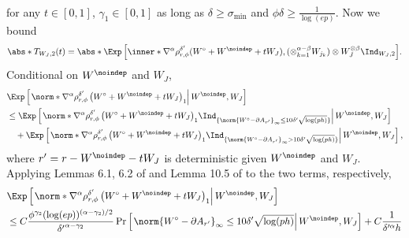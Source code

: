 \documentclass[aos]{imsart}
\begin{document}
\begin{appendix}
\begin{equation*}
\begin{aligned}
\end{aligned}
\end{equation*}
for any $t \in [0,1]$, $\gamma_1 \in [0,1]$ as long as $\delta \geq \sigma_{\min}$ and $\phi\delta \geq \frac{1}{\log(ep)}$.
Now we bound
\begin{equation*}
\begin{aligned}
    \abs*{T_{W_J,2}(t)}
    = \abs*{ \Exp\left[
        \inner*{\nabla^\alpha \rho_{r,\phi}^{\delta'} (W^\circ + W^\noindep + t W_J), 
        (\otimes_{k=1}^{\alpha-\beta} W_{j_k}) \otimes W_J^{\otimes \beta}} \Ind_{W_J, 2}
    \right] }. \\
\end{aligned}
\end{equation*}
Conditional on $W^\noindep$ and $W_J$,
\begin{equation*}
\begin{aligned}
    & \Exp\left[\left.
        \norm*{\nabla^\alpha \rho_{r,\phi}^{\delta'}
        \left(
            W^\circ + W^{\noindep} + t W_J
        \right)}_1
        \right| W^{\noindep}, W_J
    \right] \\
    & \leq \Exp\left[\left.
        \norm*{\nabla^\alpha \rho_{r,\phi}^{\delta'}
        \left(
            W^\circ + W^{\noindep} + t W_J
        \right)}_1
        \Ind_{\{ \norm{W^\circ - \partial A_{r'}}_\infty \leq 10 \delta' \sqrt{\log(ph)} \}}
        \right| W^{\noindep}, W_J
    \right] \\
    & \quad + \Exp\left[\left.
        \norm*{\nabla^\alpha \rho_{r,\phi}^{\delta'}
        \left(
            W^\circ + W^{\noindep} + t W_J
        \right)}_1
        \Ind_{\{ \norm{W^\circ - \partial A_{r'}}_\infty > 10 \delta' \sqrt{\log(ph)} \}}
        \right| W^{\noindep}, W_J
    \right],
\end{aligned}
\end{equation*}
where $r' = r - W^\noindep - t W_J$ is deterministic given $W^\noindep$ and $W_J$. Applying Lemmas 6.1, 6.2 of  and Lemma 10.5 of \citet{lopes2022central} to the two terms, respectively, 
\begin{equation*}
\begin{aligned}
    & \Exp\left[\left.
        \norm*{\nabla^\alpha \rho_{r,\phi}^{\delta'}
        \left(
            W^\circ + W^{\noindep} + t W_J
        \right)}_1
        \right| W^{\noindep}, W_J
    \right] \\
    & \leq C \frac{\phi^{\gamma_2} (\log(ep))^{(\alpha-\gamma_2)/2}}{{\delta'}^{\alpha-\gamma_2}}
    \Pr\left[\left. \norm{W^\circ - \partial A_{r'}}_\infty \leq 10 \delta' \sqrt{\log(ph)} \right| W^\noindep, W_J \right] + C \frac{1}{\delta'^\alpha h} \\

\end{aligned}
\end{equation*}
\end{appendix}
\end{document}
